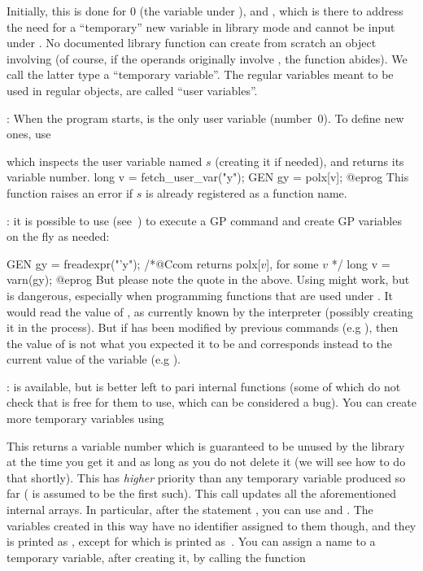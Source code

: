 Initially, this is done for $0$ (the variable  under ), and
, which is there to address the need for a ``temporary'' new
variable in library mode and cannot be input under . No documented
library function can create from scratch an object involving 
(of course, if the operands originally involve , the function
abides). We call the latter type a ``temporary variable''. The regular
variables meant to be used in regular objects, are called ``user
variables''.

: When the program starts,
 is the only user variable (number~$0$). To define new ones, use


\noindent which inspects the user variable named $s$ (creating it if needed),
and returns its variable number.
\bprog
long v = fetch_user_var("y");
GEN gy = polx[v];
@eprog\noindent
This function raises an error if $s$ is already registered as a function name.

: it is possible to use 
(see~) to execute a GP command and create GP variables
on the fly as needed:

\bprog
GEN gy = freadexpr("'y"); /*@Ccom returns polx[$v$], for some $v$ */
long v = varn(gy);
@eprog\noindent
But please note the quote  in the above. Using 
might work, but is dangerous, especially when programming functions that are
used under . It would read the value of , as currently known
by the  interpreter (possibly creating it in the process). But if
 has been modified by previous  commands (e.g ),
then the value of  is not what you expected it to be and corresponds
instead to the current value of the  variable (e.g ).

:
 is available, but is better left to pari internal functions
(some of which do not check that  is free for them to use,
which can be considered a bug). You can create more temporary variables
using

\label{se:fetch_var}

\noindent
This returns a variable number which is guaranteed to be unused by the
library at the time you get it and as long as you do not delete it (we will
see how to do that shortly). This has \emph{higher} priority than any
temporary variable produced so far ( is assumed to be the first
such). This call updates all the aforementioned internal arrays. In
particular, after the statement , you can use
 and . The variables created in this way have no
identifier assigned to them though, and they is printed as
, except for  which is printed
as~\kbd{\#}. You can assign a name to a temporary variable, after creating
it, by calling the function

